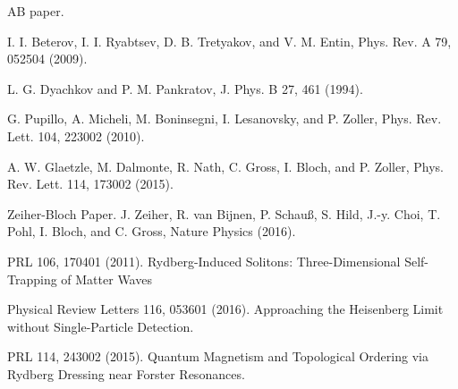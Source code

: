 \documentclass[10pt,twocolumn]{article}
\begin{document}
\begin{thebibliography}{8}
AB paper.
 
I. I. Beterov, I. I. Ryabtsev, D. B. Tretyakov, and V. M. Entin,
Phys. Rev. A 79, 052504 (2009).

L. G. Dyachkov and P. M. Pankratov, J. Phys. B 27, 461
(1994).

 G. Pupillo, A. Micheli, M. Boninsegni, I. Lesanovsky, and
P. Zoller, Phys. Rev. Lett. 104, 223002 (2010).

  A. W. Glaetzle, M. Dalmonte, R. Nath, C. Gross, I. Bloch, and P. Zoller, Phys. Rev. Lett. 114, 173002 (2015).

 Zeiher-Bloch Paper. J. Zeiher, R. van Bijnen, P. Schauß, S. Hild, J.-y. Choi,
T. Pohl, I. Bloch, and C. Gross, Nature Physics (2016).

 PRL 106, 170401 (2011). Rydberg-Induced Solitons: Three-Dimensional Self-Trapping of Matter Waves

 Physical Review Letters 116, 053601 (2016). Approaching the Heisenberg Limit without Single-Particle Detection.

 PRL 114, 243002 (2015). Quantum Magnetism and Topological Ordering via Rydberg Dressing near Forster Resonances.
 
\end{thebibliography}
\end{document}
